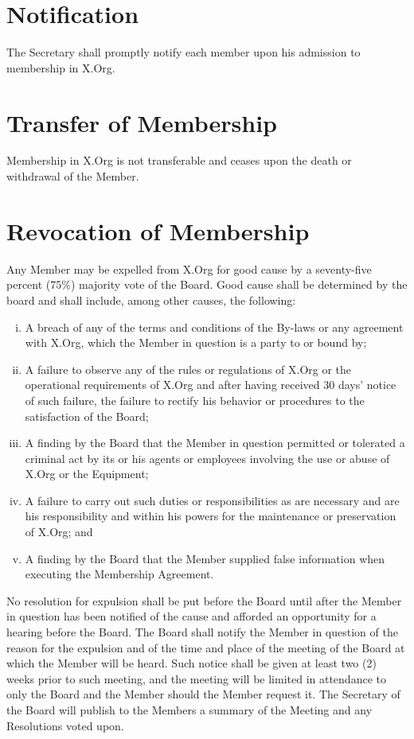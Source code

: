 \documentclass[10pt, english]{xorgdocs}
\begin{document}
\section{Notification}
The Secretary shall promptly notify each member upon his admission to membership
in X.Org.

\section{Transfer of Membership}
Membership in X.Org is not transferable and ceases upon the death or withdrawal
of the Member.

\section{Revocation of Membership}
Any Member may be expelled from X.Org for good cause by a seventy-five percent
(75\%) majority vote of the Board. Good cause shall be determined by the board
and shall include, among other causes, the following:

\begin{enumerate}[(i)\hspace{.2cm}]
	\item A breach of any of the terms and conditions of the By-laws or any
	agreement with X.Org, which the Member in question is a party to or
	bound by;

	\item A failure to observe any of the rules or regulations of X.Org or
	the operational requirements of X.Org and after having received 30
	days' notice of such failure, the failure to rectify his behavior or
	procedures to the satisfaction of the Board;

	\item A finding by the Board that the Member in question permitted or
	tolerated a criminal act by its or his agents or employees involving
	the use or abuse of X.Org or the Equipment;

	\item A failure to carry out such duties or responsibilities as are
	necessary and are his responsibility and within his powers for the
	maintenance or preservation of X.Org; and

	\item A finding by the Board that the Member supplied false information
	when executing the Membership Agreement.
\end{enumerate}

No resolution for expulsion shall be put before the Board until after the Member
in question has been notified of the cause and afforded an opportunity for a
hearing before the Board. The Board shall notify the Member in question of the
reason for the expulsion  and of the time and place of the meeting of the Board
at which the Member will be heard. Such notice shall be given at least two (2)
weeks prior to such meeting, and the meeting will be limited in attendance to
only the Board and the Member should the Member request it. The Secretary of the
Board will publish to the Members a summary of the Meeting and any Resolutions
voted upon.
\end{document}
